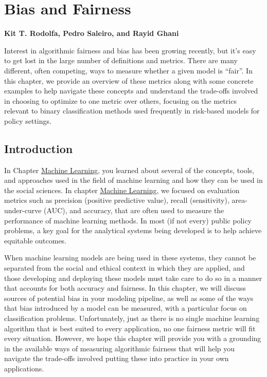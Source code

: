 \documentclass[]{krantz}
\begin{document}
\hypertarget{chap:bias}{\chapter{Bias and Fairness}\label{chap:bias}}

\textbf{Kit T. Rodolfa, Pedro Saleiro, and Rayid Ghani}

Interest in algorithmic fairness and bias has been growing recently, but
it's easy to get lost in the large number of definitions and metrics.
There are many different, often competing, ways to measure whether a
given model is ``fair''. In this chapter, we provide an overview of
these metrics along with some concrete examples to help navigate these
concepts and understand the trade-offs involved in choosing to optimize
to one metric over others, focusing on the metrics relevant to binary
classification methods used frequently in risk-based models for policy
settings.

\section{Introduction}\label{introduction-4}

In Chapter \protect\hyperlink{chap:ml}{Machine Learning}, you learned
about several of the concepts, tools, and approaches used in the field
of machine learning and how they can be used in the social sciences. In
chapter \protect\hyperlink{chap:ml}{Machine Learning}, we focused on
evaluation metrics such as precision (positive predictive value), recall
(sensitivity), area-under-curve (AUC), and accuracy, that are often used
to measure the performance of machine learning methods. In most (if not
every) public policy problems, a key goal for the analytical systems
being developed is to help achieve equitable outcomes.

When machine learning models are being used in these systems, they
cannot be separated from the social and ethical context in which they
are applied, and those developing and deploying these models must take
care to do so in a manner that accounts for both accuracy and fairness.
In this chapter, we will discuss sources of potential bias in your
modeling pipeline, as well as some of the ways that bias introduced by a
model can be measured, with a particular focus on classification
problems. Unfortunately, just as there is no single machine learning
algorithm that is best suited to every application, no one fairness
metric will fit every situation. However, we hope this chapter will
provide you with a grounding in the available ways of measuring
algorithmic fairness that will help you navigate the trade-offs involved
putting these into practice in your own applications.
\end{document}
